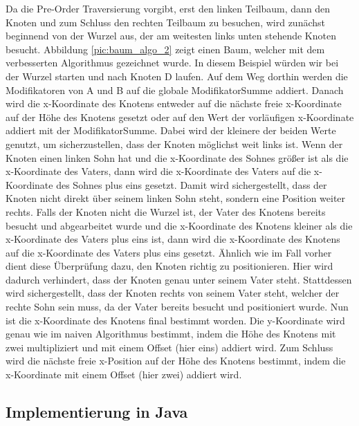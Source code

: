 Da die Pre-Order Traversierung vorgibt, erst den linken Teilbaum, dann den Knoten und zum Schluss den rechten Teilbaum zu besuchen,
wird zunächst beginnend von der Wurzel aus, der am weitesten links unten stehende Knoten besucht. Abbildung \ref{pic:baum_algo_2}
zeigt einen Baum, welcher mit dem verbesserten Algorithmus gezeichnet wurde. In diesem Beispiel würden wir bei der Wurzel starten 
und nach Knoten D laufen. Auf dem Weg dorthin werden die Modifikatoren von A und B auf die globale ModifikatorSumme addiert.
Danach wird die x-Koordinate des Knotens entweder auf die nächste freie x-Koordinate auf der Höhe des Knotens gesetzt oder auf den
Wert der vorläufigen x-Koordinate addiert mit der ModifikatorSumme. Dabei wird der kleinere der beiden Werte genutzt, um sicherzustellen,
dass der Knoten möglichst weit links ist. Wenn der Knoten einen linken Sohn hat und die x-Koordinate des Sohnes größer ist als
die x-Koordinate des Vaters, dann wird die x-Koordinate des Vaters auf die x-Koordinate des Sohnes plus eins gesetzt. 
Damit wird sichergestellt, dass der Knoten nicht direkt über seinem linken Sohn steht, sondern eine Position weiter rechts.
Falls der Knoten nicht die Wurzel ist, der Vater des Knotens bereits besucht und abgearbeitet wurde und die x-Koordinate des Knotens
kleiner als die x-Koordinate des Vaters plus eins ist, dann wird die x-Koordinate des Knotens auf die x-Koordinate des Vaters plus eins gesetzt.
Ähnlich wie im Fall vorher dient diese Überprüfung dazu, den Knoten richtig zu positionieren. Hier wird dadurch verhindert,
dass der Knoten genau unter seinem Vater steht. Stattdessen wird sichergestellt, dass der Knoten rechts von seinem Vater steht,
welcher der rechte Sohn sein muss, da der Vater bereits besucht und positioniert wurde. Nun ist die x-Koordinate des Knotens final
bestimmt worden. Die y-Koordinate wird genau wie im naiven Algorithmus bestimmt, indem die Höhe des Knotens mit zwei multipliziert
und mit einem Offset (hier eins) addiert wird. Zum Schluss wird die nächste freie x-Position auf der Höhe des Knotens bestimmt,
indem die x-Koordinate mit einem Offset (hier zwei) addiert wird. 


\subsection{Implementierung in Java}


